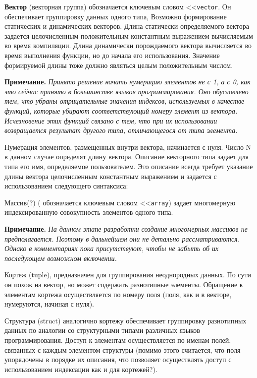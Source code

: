 {\textbf{Вектор} (векторная группа) обозначается ключевым словом <<\verb|vector|. Он обеспечивает группировку данных одного типа, Возможно формирование статических и динамических векторов. Длина статически определяемого вектора задается целочисленным положительным константным выражением вычисляемым во время компиляции. Длина динамически порождаемого вектора вычисляется во время выполнения функции, но до начала его использования. Значение формируемой длины тоже должно являться целым положительным числом.

\textbf{Примечание.}
\textit{Принято решение начать нумерацию элементов не с 1, а с 0, как это сейчас принято в большинстве языков программирования. Оно обусловлено тем, что убраны отрицательные значения индексов, используемых в качестве функций, которые убирают соответствующий номеру элемент из вектора. Исчезновение этих функций связано с тем, что при их использовании возвращается результат другого типа, отличающегося от типа элемента.}

Нумерация элементов, размещенных внутри вектора, начинается с нуля. Число N в данном случае определят длину вектора. Описание векторного типа задает для типа его имя, определяемое пользователем. Это описание всегда требует указание длины вектора целочисленным константным выражением и задается с использованием следующего синтаксиса:

Массив(?) ( обозначается ключевым словом <<\verb|array|) задает многомерную индексированную совокупность элементов одного типа.

\textbf{Примечание.}
\textit{На данном этапе разработки создание многомерных массивов не предполагается. Поэтому в дальнейшем они не детально рассматриваются. Однако в комментариях пока присутствуют, чтобы не забыть об их последующем возможном включении.}

Кортеж (tuple), предназначен для группирования неоднородных данных. По сути он похож на вектор, но может содержать разнотипные элементы. Обращение к элементам кортежа осуществляется по номеру поля (поля, как и в векторе, нумеруются, начиная с нуля).

Структура (struct) аналогично кортежу обеспечивает группировку разнотипных данных по аналогии со структурными типами различных языков программирования. Доступ к элементам осуществляется по именам полей, связанных с каждым элементом структуры (помимо этого считается, что поля упорядочены в порядке их описания, что позволяет осуществлять доступ с использованием индексации как и для кортежей?).

}
